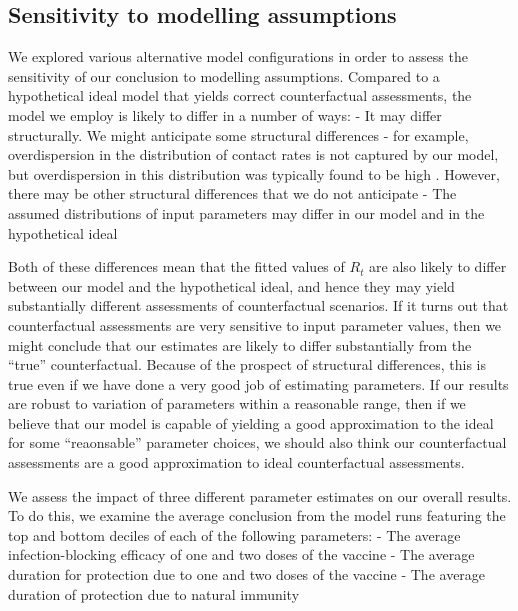 \documentclass{article}
\begin{document}
\hypertarget{sensitivity-to-modelling-assumptions}{%
\subsection{Sensitivity to modelling assumptions}\label{sensitivity-to-modelling-assumptions}}

We explored various alternative model configurations in order to assess the sensitivity of our conclusion to modelling assumptions. Compared to a hypothetical ideal model that yields correct counterfactual assessments, the model we employ is likely to differ in a number of ways:
- It may differ structurally. We might anticipate some structural differences - for example, overdispersion in the distribution of contact rates is not captured by our model, but overdispersion in this distribution was typically found to be high \citep{endoEstimatingOverdispersionCOVID192020}. However, there may be other structural differences that we do not anticipate
- The assumed distributions of input parameters may differ in our model and in the hypothetical ideal

Both of these differences mean that the fitted values of \(R_t\) are also likely to differ between our model and the hypothetical ideal, and hence they may yield substantially different assessments of counterfactual scenarios. If it turns out that counterfactual assessments are very sensitive to input parameter values, then we might conclude that our estimates are likely to differ substantially from the ``true'' counterfactual. Because of the prospect of structural differences, this is true even if we have done a very good job of estimating parameters. If our results are robust to variation of parameters within a reasonable range, then if we believe that our model is capable of yielding a good approximation to the ideal for some ``reaonsable'' parameter choices, we should also think our counterfactual assessments are a good approximation to ideal counterfactual assessments.

We assess the impact of three different parameter estimates on our overall results. To do this, we examine the average conclusion from the model runs featuring the top and bottom deciles of each of the following parameters:
- The average infection-blocking efficacy of one and two doses of the vaccine
- The average duration for protection due to one and two doses of the vaccine
- The average duration of protection due to natural immunity
\end{document}
